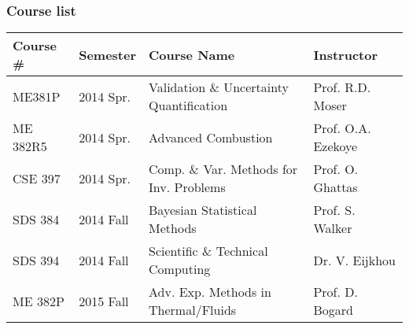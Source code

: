 \documentclass[mathserif]{beamer}
\begin{document}
%
%
%
\begin{frame}
 \frametitle{Course list}
 \footnotesize
 \begin{table}[h]
  \centering
  \begin{tabular}{llll}
   \hline \hline
   Course \# & Semester & Course Name & Instructor \\ 
   \hline 
   ME381P   & 2014 Spr.   & Validation \& Uncertainty Quantification &
	       Prof. R.D. Moser \\
   ME 382R5 & 2014 Spr.   & Advanced Combustion & Prof. O.A. Ezekoye \\
   CSE 397  & 2014 Spr.   &  Comp. \& Var. Methods for
	   Inv. Problems & Prof. O. Ghattas \\
   SDS 384  & 2014 Fall   & Bayesian Statistical Methods & Prof. S.
	       Walker \\
   SDS 394  & 2014 Fall   & Scientific \& Technical Computing & Dr. V. Eijkhou \\
   ME 382P  & 2015 Fall   & Adv. Exp. Methods in Thermal/Fluids
	   & Prof. D. Bogard \\  
   \hline \hline
  \end{tabular} 
 \end{table}

\end{frame}
\end{document}
